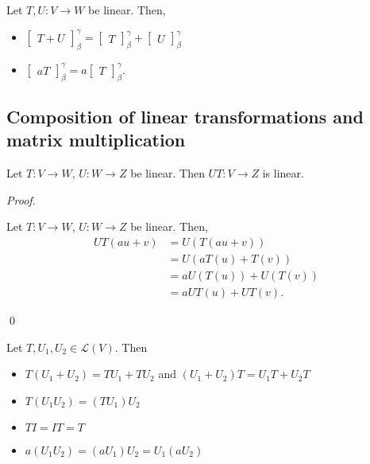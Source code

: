 \documentclass[12pt]{article}
\newenvironment{theorem}[2][Theorem]{\begin{trivlist}
\item[\hskip \labelsep {\bfseries #1}\hskip \labelsep {\bfseries #2.}]}{\end{trivlist}}
\newenvironment{sol}
    {\emph{Proof.}
    }
    {
    \qed
    }
\begin{document}
\begin{theorem}{2.8}
Let $T,U : V \to W$ be linear. Then,

\begin{itemize}
    \item $\begin{bmatrix} T+U \end{bmatrix}_\beta^\gamma = \begin{bmatrix} T \end{bmatrix}_\beta^\gamma + \begin{bmatrix} U \end{bmatrix}_\beta^\gamma$
    \item $\begin{bmatrix} aT \end{bmatrix}_\beta^\gamma = a\begin{bmatrix} T \end{bmatrix}_\beta^\gamma$.
\end{itemize}
\end{theorem}

\subsection{Composition of linear transformations and matrix multiplication}

\begin{theorem}{2.9}
Let $T : V \to W$, $U : W \to Z$ be linear. Then $UT : V \to Z$ is linear.
\end{theorem}

\begin{sol}
Let $T : V \to W$, $U : W \to Z$ be linear. Then, \begin{align*}
    UT(au + v) &= U(T(au+v)) \\
    &= U(aT(u) + T(v)) \\
    &= aU(T(u)) + U(T(v)) \\
    &= aUT(u) + UT(v).
\end{align*}
\end{sol}

\begin{theorem}{2.10}
Let $T, U_1, U_2 \in \mathcal{L}(V)$. Then 

\begin{itemize}
    \item $T(U_1 + U_2) = TU_1 + TU_2$ and $(U_1 + U_2)T = U_1T + U_2T$
    \item $T(U_1U_2) = (TU_1)U_2$
    \item $TI = IT = T$
    \item $a(U_1U_2) = (aU_1)U_2 = U_1(aU_2)$
\end{itemize}
\end{theorem}
\end{document}
